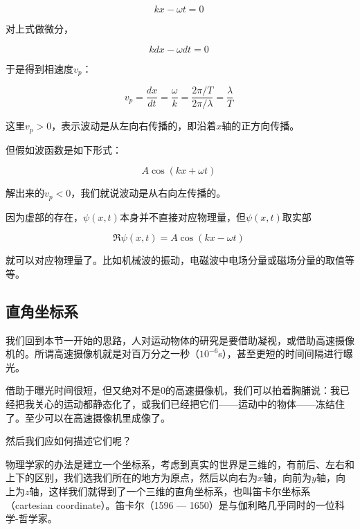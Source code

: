 \begin{equation}
 k x  - \omega t = 0~
\end{equation}

对上式做微分，

\begin{equation}
 k dx - \omega dt  = 0~
\end{equation}

于是得到相速度$v_p$：

\begin{equation}
v_p = \frac{dx}{dt}= \frac{\omega}{k} = \frac{2 \pi / T}{2 \pi / \lambda} = \frac{\lambda }{T }~
\end{equation}

这里$v_p > 0$，表示波动是从左向右传播的，即沿着$x$轴的正方向传播。

但假如波函数是如下形式：

\begin{equation}
A \cos (kx + \omega t)~
\end{equation}

解出来的$v_p < 0$，我们就说波动是从右向左传播的。


因为虚部的存在，$\psi (x,t)$本身并不直接对应物理量，但$\psi (x,t)$取实部

\begin{equation}
\Re \psi (x,t) = A \cos (kx - \omega t)~
\end{equation}

就可以对应物理量了。比如机械波的振动，电磁波中电场分量或磁场分量的取值等等。

\subsection{直角坐标系}

我们回到本节一开始的思路，人对运动物体的研究是要借助凝视，或借助高速摄像机的。所谓高速摄像机就是对百万分之一秒（$10^{-6}$s），甚至更短的时间间隔进行曝光。

借助于曝光时间很短，但又绝对不是0的高速摄像机，我们可以拍着胸脯说：我已经把我关心的运动都静态化了，或我们已经把它们——运动中的物体——冻结住了。至少可以在高速摄像机里成像了。

然后我们应如何描述它们呢？

物理学家的办法是建立一个坐标系，考虑到真实的世界是三维的，有前后、左右和上下的区别，我们选我们所在的地方为原点，然后以向右为$x$轴，向前为$y$轴，向上为$z$轴，这样我们就得到了一个三维的直角坐标系，也叫笛卡尔坐标系（cartesian coordinate）。笛卡尔（1596 — 1650）是与伽利略几乎同时的一位科学-哲学家。

